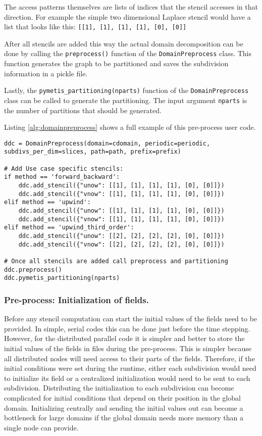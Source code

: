 The access patterns themselves are lists of indices that the stencil accesses in that direction.
For example the simple two dimensional Laplace stencil would have a list that looks like this: \texttt{[[1], [1], [1], [1], [0], [0]]}

After all stencils are added this way the actual domain decomposition can be done by calling the \texttt{preprocess()} function of the \texttt{DomainPreprocess} class.
This function generates the graph to be partitioned and saves the subdivision information in a pickle file.

Lastly, the \texttt{pymetis\_partitioning(nparts)} function of the \texttt{DomainPreprocess} class can be called to generate the partitioning. The input argument \texttt{nparts} is the number of partitions that should be generated.

Listing \ref{alg:domainpreprocess} shows a full example of this pre-process user code.

\begin{lstlisting}[caption={Example code of the domain pre-process function calls and additional information needed to decompose a domain.},captionpos=b, label={alg:domainpreprocess}, float, floatplacement=H]
ddc = DomainPreprocess(domain=cdomain, periodic=periodic, subdivs_per_dim=slices, path=path, prefix=prefix)

# Add Use case specific stencils:
if method == 'forward_backward':
    ddc.add_stencil({"unow": [[1], [1], [1], [1], [0], [0]]})
    ddc.add_stencil({"vnow": [[1], [1], [1], [1], [0], [0]]})
elif method == 'upwind':
    ddc.add_stencil({"unow": [[1], [1], [1], [1], [0], [0]]})
    ddc.add_stencil({"vnow": [[1], [1], [1], [1], [0], [0]]})
elif method == 'upwind_third_order':
    ddc.add_stencil({"unow": [[2], [2], [2], [2], [0], [0]]})
    ddc.add_stencil({"vnow": [[2], [2], [2], [2], [0], [0]]})

# Once all stencils are added call preprocess and partitioning
ddc.preprocess()
ddc.pymetis_partitioning(nparts)
\end{lstlisting}

\subsubsection{Pre-process: Initialization of fields.}
Before any stencil computation can start the initial values of the fields need to be provided.
In simple, serial codes this can be done just before the time stepping.
However, for the distributed parallel code it is simpler and better to store the initial values of the fields in files during the pre-process.
This is simpler because all distributed nodes will need access to their parts of the fields.
Therefore, if the initial conditions were set during the runtime, either each subdivision would need to initialize its field or a centralized initialization would need to be sent to each subdivision.
Distributing the initialization to each subdivision can become complicated for initial conditions that depend on their position in the global domain.
Initializing centrally and sending the initial values out can become a bottleneck for large domains if the global domain needs more memory than a single node can provide.

